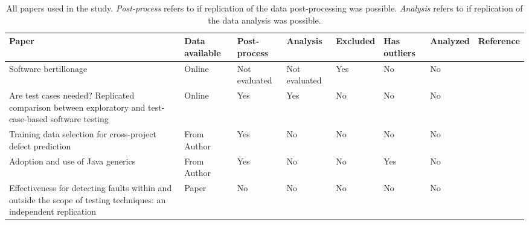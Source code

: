 ﻿\begin{landscape}
\begin{longtabu} to \linewidth{X[2]XXXXXXX}
\caption{All papers used in the study. \emph{Post-process} refers to if replication of the data post-processing was possible. \emph{Analysis} refers to if replication of the data analysis was possible.}\\
\hline
\textbf{Paper}                                                                                                                                            & \textbf{Data available}\strut & \textbf{Post-process}\strut & \textbf{Analysis}\strut & \textbf{Excluded}\strut & \textbf{Has outliers}\strut & \textbf{Analyzed}\strut & \textbf{Reference}\strut \\ \hline \endhead
Software bertillonage\strut                                                                                                                                     & Online                  & Not evaluated         & Not evaluated     & Yes                                & No                    & No                & \citet{davies2013software}\strut        \\ \hline
Are test cases needed? Replicated comparison between exploratory and test-case-based software testing\strut                                                     & Online                  & Yes                   & Yes               & No                                 & No                    & No                & \citet{itkonen2013test}\strut           \\ \hline
Training data selection for cross-project defect prediction\strut                                                                                               & From Author             & Yes                   & No                & No                                 & No                    & No                & \citet{herbold2013training}\strut       \\ \hline
Adoption and use of Java generics\strut                                                                                                                         & From Author             & Yes                   & No                & No                                 & Yes                   & No                & \citet{parnin2013adoption}\strut        \\ \hline
Effectiveness for detecting faults within and outside the scope of testing techniques: an independent replication\strut                                         & Paper                   & No                    & No                & No                                 & No                    & No                & \citet{apaeffectiveness}\strut          \\ \hline

\end{longtabu}
\end{landscape}
